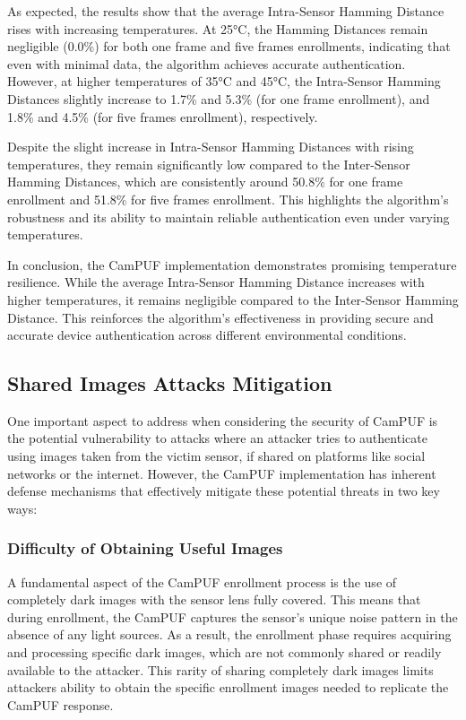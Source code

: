 As expected, the results show that the average Intra-Sensor Hamming Distance rises with increasing temperatures. At 25°C, the Hamming Distances remain negligible (0.0\%) for both one frame and five frames enrollments, indicating that even with minimal data, the algorithm achieves accurate authentication. However, at higher temperatures of 35°C and 45°C, the Intra-Sensor Hamming Distances slightly increase to 1.7\% and 5.3\% (for one frame enrollment), and 1.8\% and 4.5\% (for five frames enrollment), respectively.

Despite the slight increase in Intra-Sensor Hamming Distances with rising temperatures, they remain significantly low compared to the Inter-Sensor Hamming Distances, which are consistently around 50.8\% for one frame enrollment and 51.8\% for five frames enrollment. This highlights the algorithm's robustness and its ability to maintain reliable authentication even under varying temperatures.

In conclusion, the CamPUF implementation demonstrates promising temperature resilience. While the average Intra-Sensor Hamming Distance increases with higher temperatures, it remains negligible compared to the Inter-Sensor Hamming Distance. This reinforces the algorithm's effectiveness in providing secure and accurate device authentication across different environmental conditions.

\subsection{Shared Images Attacks Mitigation}\label{sec:attacks}

One important aspect to address when considering the security of CamPUF is the potential vulnerability to attacks where an attacker tries to authenticate using images taken from the victim sensor, if shared on platforms like social networks or the internet. However, the CamPUF implementation has inherent defense mechanisms that effectively mitigate these potential threats in two key ways:

\subsubsection{Difficulty of Obtaining Useful Images}

A fundamental aspect of the CamPUF enrollment process is the use of completely dark images with the sensor lens fully covered. This means that during enrollment, the CamPUF captures the sensor's unique noise pattern in the absence of any light sources. As a result, the enrollment phase requires acquiring and processing specific dark images, which are not commonly shared or readily available to the attacker. This rarity of sharing completely dark images limits attackers ability to obtain the specific enrollment images needed to replicate the CamPUF response.

